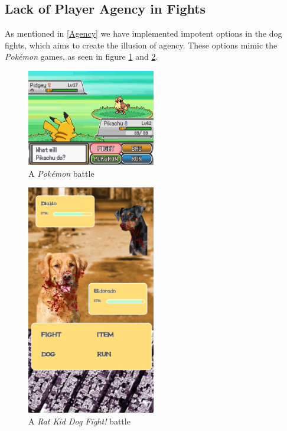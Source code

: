 \subsection{Lack of Player Agency in Fights}
As mentioned in \ref{Agency} we have implemented impotent options in the dog fights, which aims to create the illusion of agency. These options mimic the \textit{Pokémon} games, as seen in figure \ref{fig:PokeBattle} and \ref{fig:DogFightBattle}. \

\begin{figure}[h!] 
	\centering
    \includegraphics[width=0.5\textwidth]{PokemonBattle.png}
    \caption{A \textit{Pokémon} battle}
    \label{fig:PokeBattle}
\end{figure}

\begin{figure}[h!]
	\centering
    \includegraphics[width=0.5\textwidth]{battle.png}
    \caption{A \textit{Rat Kid Dog Fight!} battle}
    \label{fig:DogFightBattle}
\end{figure}


